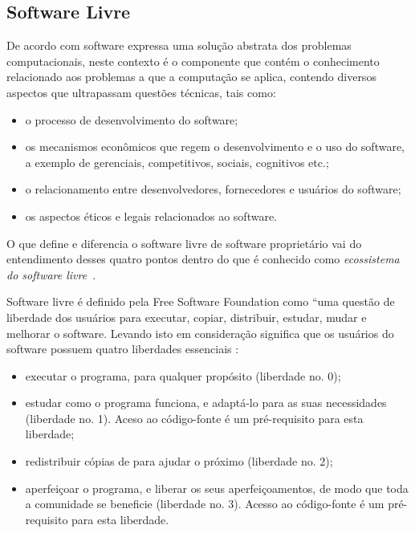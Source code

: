 
\subsection{Software Livre}
\label{soft-livre}

De acordo com \cite{meirelles2013} software expressa uma solução abstrata dos problemas computacionais, neste contexto é o componente que contém o conhecimento relacionado aos problemas a que a computação se aplica, contendo diversos aspectos que ultrapassam questões técnicas, tais como:
\begin{itemize}
\item o processo de desenvolvimento do software;
\item os mecanismos econômicos que regem o desenvolvimento e o uso do software, a exemplo de gerenciais, competitivos, sociais, cognitivos etc.;
\item o relacionamento entre desenvolvedores, fornecedores e usuários do software;
\item os aspectos éticos e legais relacionados ao software.
\end{itemize}

O que define e diferencia o software livre de software proprietário vai do entendimento desses quatro pontos dentro do que é conhecido como \textit{ecossistema do software livre}~\cite{meirelles2013}.

Software livre é definido pela Free Software Foundation como “uma questão de liberdade dos usuários para executar, copiar, distribuir, estudar, mudar e melhorar o software. Levando isto em consideração significa que os usuários do software possuem quatro liberdades essenciais \cite{stallman2002free}:

\begin{itemize}
\item executar o programa, para qualquer propósito (liberdade no. 0);
\item estudar como o programa funciona, e adaptá-lo para as suas necessidades (liberdade no. 1). Aceso ao código-fonte é um pré-requisito para esta liberdade;
\item redistribuir cópias de para ajudar o próximo (liberdade no. 2);
\item aperfeiçoar o programa, e liberar os seus aperfeiçoamentos, de modo que toda a comunidade se beneficie (liberdade no. 3). Acesso ao código-fonte é um pré-requisito para esta liberdade.
\end{itemize}

